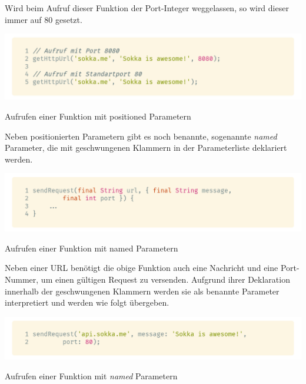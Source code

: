 Wird beim Aufruf dieser Funktion der Port-Integer weggelassen, so wird dieser immer auf 80 gesetzt.

\begin{code}
    \centering
    \includegraphics[width=1\textwidth]{images/Dart/theory/dartCallPositionedFunction.png}
    \vspace{-25pt}
    \caption{Aufrufen einer Funktion mit positioned Parametern}
\end{code}

\newpage

Neben positionierten Parametern gibt es noch \glqq benannte\grqq , sogenannte \textit{named} Parameter, die mit geschwungenen Klammern in der Parameterliste deklariert werden.

\begin{code}
    \centering
    \includegraphics[width=1\textwidth]{images/Dart/theory/dartNamedArguments.png}
    \vspace{-25pt}
    \caption{Aufrufen einer Funktion mit named Parametern}
\end{code}

Neben einer URL benötigt die obige Funktion auch eine Nachricht und eine Port-Nummer, um einen gültigen Request zu versenden. Aufgrund ihrer Deklaration innerhalb der geschwungenen Klammern
werden sie als benannte Parameter interpretiert und werden wie folgt übergeben.

\begin{code}[h]
    \centering
    \includegraphics[width=1\textwidth]{images/Dart/theory/dartCallNamedArguments.png}
    \vspace{-25pt}
    \caption{Aufrufen einer Funktion mit \textit{named} Parametern}
\end{code}

